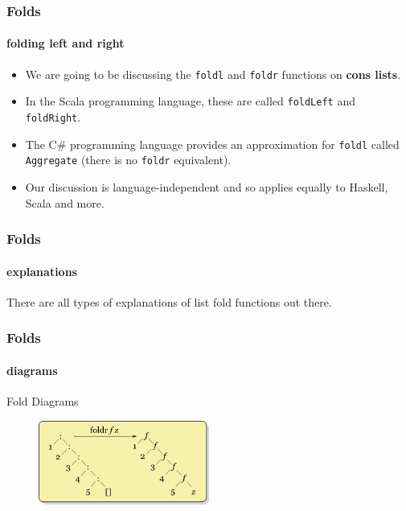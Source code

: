 \begin{frame}
\frametitle{Folds}
\framesubtitle{folding left and right}

\begin{itemize}
\item We are going to be discussing the \lstinline[basicstyle=\ttfamily]$foldl$ and \lstinline[basicstyle=\ttfamily]$foldr$ functions on \textbf{cons lists}.
\item In the Scala programming language, these are called \lstinline[basicstyle=\ttfamily]$foldLeft$ and \lstinline[basicstyle=\ttfamily]$foldRight$.
\item The C\# programming language provides an approximation for \lstinline[basicstyle=\ttfamily]$foldl$ called \lstinline[basicstyle=\ttfamily]$Aggregate$ (there is no \lstinline[basicstyle=\ttfamily]$foldr$ equivalent).
\item Our discussion is language-independent and so applies equally to Haskell, Scala and more. 
\end{itemize}

\end{frame}


\begin{frame}
\frametitle{Folds}
\framesubtitle{explanations}

\center
There are all types of explanations of list fold functions out there.

\end{frame}


\begin{frame}
\frametitle{Folds}
\framesubtitle{diagrams}

\begin{block}{Fold Diagrams}

\begin{figure}
\includegraphics[width=0.5\textwidth,natwidth=320,natheight=158]{res/image/Right-fold-transformation.png}
\end{figure}

\end{block}

\end{frame}


